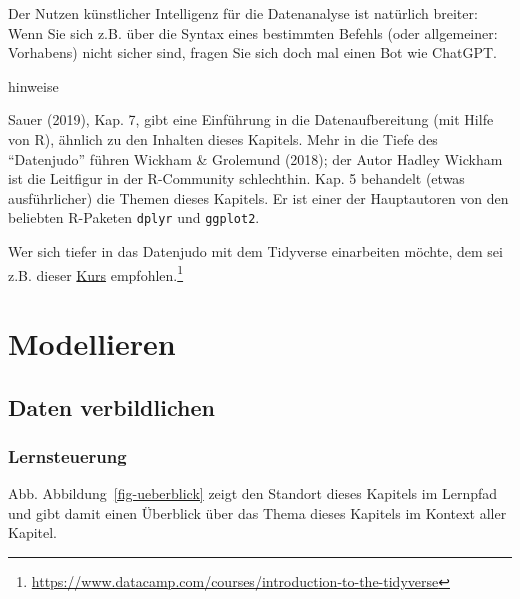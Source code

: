 \documentclass[
  a4paper,
]{scrbook}
\theoremstyle{definition}
\theoremstyle{definition}
\theoremstyle{definition}
\theoremstyle{remark}
\begin{document}
\begin{tcolorbox}[enhanced jigsaw, colbacktitle=quarto-callout-note-color!10!white, bottomrule=.15mm, left=2mm, breakable, rightrule=.15mm, coltitle=black, title=\textcolor{quarto-callout-note-color}{\faInfo}\hspace{0.5em}{Hinweis}, colback=white, leftrule=.75mm, titlerule=0mm, opacityback=0, bottomtitle=1mm, toprule=.15mm, arc=.35mm, toptitle=1mm, opacitybacktitle=0.6, colframe=quarto-callout-note-color-frame]

Der Nutzen künstlicher Intelligenz für die Datenanalyse ist natürlich
breiter: Wenn Sie sich z.B. über die Syntax eines bestimmten Befehls
(oder allgemeiner: Vorhabens) nicht sicher sind, fragen Sie sich doch
mal einen Bot wie ChatGPT.

\end{tcolorbox}

hinweise

Sauer (2019), Kap. 7, gibt eine Einführung in die Datenaufbereitung (mit
Hilfe von R), ähnlich zu den Inhalten dieses Kapitels. Mehr in die Tiefe
des ``Datenjudo'' führen Wickham \& Grolemund (2018); der Autor Hadley
Wickham ist die Leitfigur in der R-Community schlechthin. Kap. 5
behandelt (etwas ausführlicher) die Themen dieses Kapitels. Er ist einer
der Hauptautoren von den beliebten R-Paketen \texttt{dplyr} und
\texttt{ggplot2}.

Wer sich tiefer in das Datenjudo mit dem Tidyverse einarbeiten möchte,
dem sei z.B. dieser
\href{https://www.datacamp.com/courses/introduction-to-the-tidyverse}{Kurs}
empfohlen.\footnote{\url{https://www.datacamp.com/courses/introduction-to-the-tidyverse}}

\part{Modellieren}

\chapter{Daten verbildlichen}\label{daten-verbildlichen}

\section{Lernsteuerung}\label{lernsteuerung-3}

Abb. Abbildung~\ref{fig-ueberblick} zeigt den Standort dieses Kapitels
im Lernpfad und gibt damit einen Überblick über das Thema dieses
Kapitels im Kontext aller Kapitel.
\end{document}
